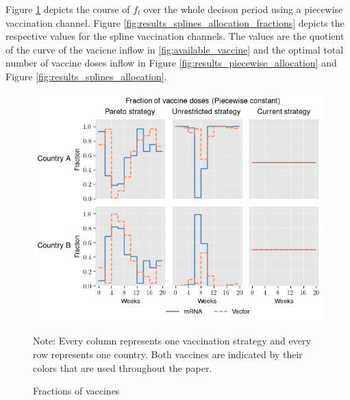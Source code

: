 Figure \ref{fig:results_piecewise_allocation_fractions} depicts the course of $f_l$ over the whole decison period using a piecewise vaccination channel. Figure \ref{fig:results_splines_allocation_fractions} depicts the respective values for the spline vaccination channels. The values are the quotient of the curve of the vacicne inflow in \ref{fig:available_vaccine} and the optimal total number of vaccine doses inflow in Figure \ref{fig:results_piecewise_allocation} and Figure \ref{fig:results_splines_allocation}.
\begin{figure}[h!]
\centering
\includegraphics[scale=0.85]{images/piecewise_vaccine_fractions.png}\\
\begin{flushleft}
\scriptsize{Note:} Every column represents one vaccination strategy and every row represents one country. Both vaccines are indicated by their colors that are used throughout the paper. 
\end{flushleft}
\caption{Fractions of vaccines}
\label{fig:results_piecewise_allocation_fractions}
\end{figure}

